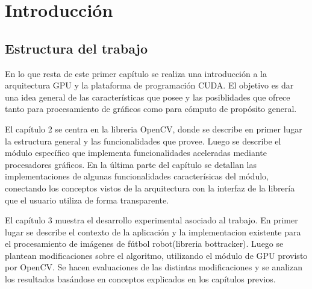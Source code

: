 \documentclass[a4paper,10pt]{report}
\begin{document}
\chapter{Introducción}

\section{Estructura del trabajo}
En lo que resta de este primer capítulo se realiza una introducción a la arquitectura GPU y la plataforma de programación CUDA. 
El objetivo es dar una idea general de las características que posee y las posiblidades que ofrece tanto para procesamiento de gráficos como para cómputo de propósito general.


El capítulo 2 se centra en la libreria OpenCV, donde se describe en primer lugar la estructura general y las funcionalidades que provee. 
Luego se describe el módulo específico que implementa funcionalidades aceleradas mediante procesadores gráficos.
En la última parte del capítulo se detallan las implementaciones de algunas funcionalidades caracterísicas del módulo, conectando los conceptos vistos de la arquitectura con la interfaz de la librería que el usuario utiliza de forma transparente. 


El capítulo 3 muestra el desarrollo experimental asociado al trabajo. En primer lugar se describe el contexto de la aplicación y la implementacion existente para el procesamiento de imágenes de fútbol robot(libreria bottracker).
Luego se plantean modificaciones sobre el algoritmo, utilizando el módulo de GPU provisto por OpenCV. Se hacen evaluaciones de las distintas modificaciones y se analizan los resultados basándose en conceptos explicados en los capítulos previos.
\end{document}
